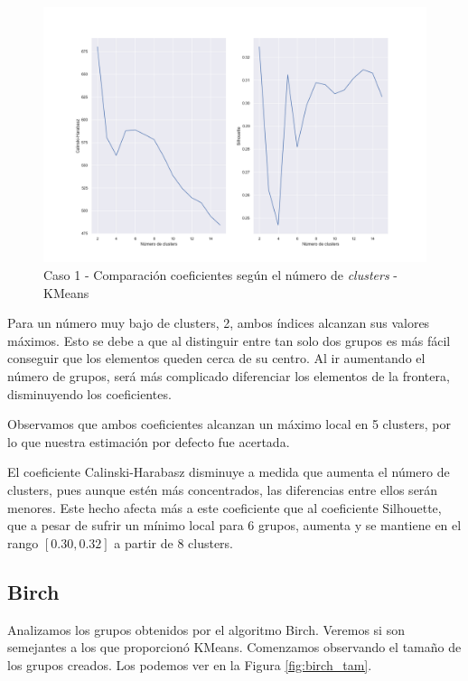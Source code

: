 \documentclass[a4paper, 20pt]{article}
\begin{document}
\begin{figure}[H]
    \centering
    \includegraphics[width=1.2\textwidth, height=0.45\textheight]{./caso1/param_kmeans}
    \caption{Caso 1 - Comparación coeficientes según el número de \textit{clusters} - KMeans}
    \label{fig:param_kmeans1}
\end{figure}

Para un número muy bajo de clusters, 2, ambos índices alcanzan sus valores máximos. Esto se debe a que al distinguir entre tan solo dos grupos es más fácil conseguir que los elementos queden cerca de su centro. Al ir aumentando el número de grupos, será más complicado diferenciar los elementos de la frontera, disminuyendo los coeficientes.

Observamos que ambos coeficientes alcanzan un máximo local en 5 clusters, por lo que nuestra estimación por defecto fue acertada.

El coeficiente Calinski-Harabasz disminuye a medida que aumenta el número de clusters, pues aunque estén más concentrados, las diferencias entre ellos serán menores. Este hecho afecta más a este coeficiente que al coeficiente Silhouette, que a pesar de sufrir un mínimo local para 6 grupos, aumenta y se mantiene en el rango $[0.30, 0.32]$ a partir de 8 clusters.

\subsection{Birch}

Analizamos los grupos obtenidos por el algoritmo Birch. Veremos si son semejantes a los que proporcionó KMeans. Comenzamos observando el tamaño de los grupos creados. Los podemos ver en la Figura \ref{fig:birch_tam}.
\end{document}
